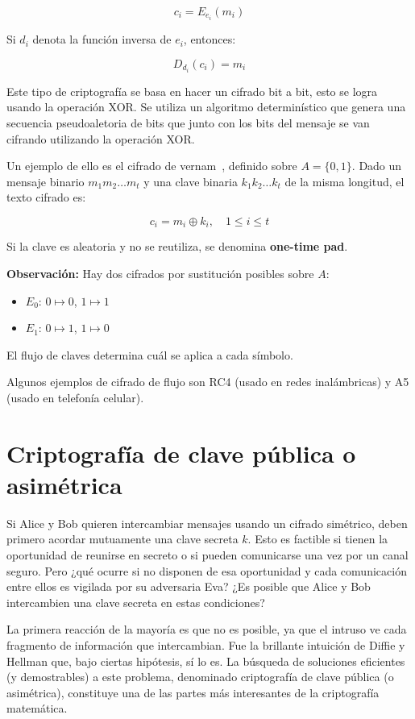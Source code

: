 \[
c_i = E_{e_i}(m_i)
\]

Si $d_i$ denota la función inversa de $e_i$, entonces:

\[
D_{d_i}(c_i) = m_i
\]

Este tipo de criptografía se basa en hacer un cifrado bit a bit, esto se logra usando la operación XOR. Se utiliza un algoritmo determinístico que genera una secuencia pseudoaletoria de bits que junto con los bits del mensaje se van cifrando utilizando la operación XOR.

Un ejemplo de ello es el cifrado de vernam~\citep{vernam}, definido sobre $A = \{0, 1\}$. Dado un mensaje binario $m_1m_2\ldots m_t$ y una clave binaria $k_1k_2\ldots k_t$ de la misma longitud, el texto cifrado es:

\[
c_i = m_i \oplus k_i, \quad 1 \leq i \leq t
\]

Si la clave es aleatoria y no se reutiliza, se denomina \textbf{one-time pad}.

\textbf{Observación:} Hay dos cifrados por sustitución posibles sobre $A$:
\begin{itemize}
    \item $E_0$: $0 \mapsto 0$, $1 \mapsto 1$
    \item $E_1$: $0 \mapsto 1$, $1 \mapsto 0$
\end{itemize}

El flujo de claves determina cuál se aplica a cada símbolo.

Algunos ejemplos de cifrado de flujo son RC4 (usado en redes inalámbricas)\cite{rc4-ietf,rc4-gfg} y A5 (usado en
telefonía celular)\cite{a5-nop,a5-ucsb}.

\section{Criptografía de clave pública o asimétrica}
Si Alice y Bob quieren intercambiar mensajes usando un cifrado simétrico, deben primero acordar mutuamente una clave secreta \(k\). Esto es factible si tienen la oportunidad de reunirse en secreto o si pueden comunicarse una vez por un canal seguro. Pero ¿qué ocurre si no disponen de esa oportunidad y cada comunicación entre ellos es vigilada por su adversaria Eva? ¿Es posible que Alice y Bob intercambien una clave secreta en estas condiciones?

La primera reacción de la mayoría es que no es posible, ya que el intruso ve cada fragmento de información que intercambian. Fue la brillante intuición de Diffie y Hellman que, bajo ciertas hipótesis, sí lo es. La búsqueda de soluciones eficientes (y demostrables) a este problema, denominado criptografía de clave pública (o asimétrica), constituye una de las partes más interesantes de la criptografía matemática.

